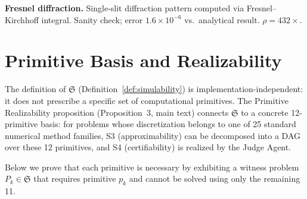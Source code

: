 \documentclass[11pt,a4paper]{article}
\newcommand{\Sclass}{\mathfrak{S}}
\begin{document}
\textbf{Fresnel diffraction.} Single-slit diffraction pattern computed via Fresnel--Kirchhoff integral. Sanity check; error $1.6 \times 10^{-6}$ vs.\ analytical result. $\rho = 432\times$.

\section{Primitive Basis and Realizability}
\label{sec:s4}

The definition of $\Sclass$ (Definition~\ref{def:simulability}) is implementation-independent: it does not prescribe a specific set of computational primitives. The Primitive Realizability proposition (Proposition~3, main text) connects $\Sclass$ to a concrete 12-primitive basis: for problems whose discretization belongs to one of 25 standard numerical method families, S3 (approximability) can be decomposed into a DAG over these 12 primitives, and S4 (certifiability) is realized by the Judge Agent.

Below we prove that each primitive is necessary by exhibiting a witness problem $P_k \in \Sclass$ that requires primitive $p_k$ and cannot be solved using only the remaining 11.
\end{document}
